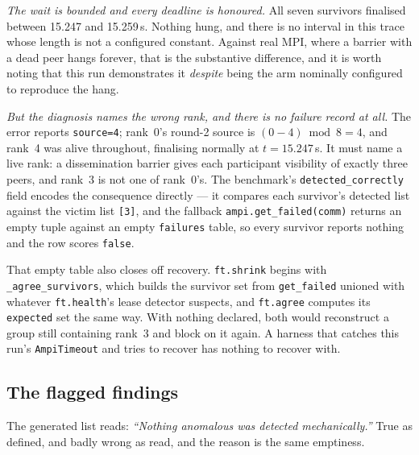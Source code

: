 \documentclass[11pt]{article}
\begin{document}
\emph{The wait is bounded and every deadline is honoured.} All seven survivors finalised
between 15.247 and 15.259\,s. Nothing hung, and there is no interval in this trace whose
length is not a configured constant. Against real MPI, where a barrier with a dead peer
hangs forever, that is the substantive difference, and it is worth noting that this run
demonstrates it \emph{despite} being the arm nominally configured to reproduce the hang.

\emph{But the diagnosis names the wrong rank, and there is no failure record at all.} The
error reports \texttt{source=4}; rank~0's round-2 source is $(0-4) \bmod 8 = 4$, and
rank~4 was alive throughout, finalising normally at $t=15.247$\,s. It must name a live
rank: a dissemination barrier gives each participant visibility of exactly three peers,
and rank~3 is not one of rank~0's. The benchmark's \texttt{detected\_correctly} field
encodes the consequence directly --- it compares each survivor's detected list against the
victim list \texttt{[3]}, and the fallback \texttt{ampi.get\_failed(comm)} returns an empty
tuple against an empty \texttt{failures} table, so every survivor reports nothing and the
row scores \texttt{false}.

That empty table also closes off recovery. \texttt{ft.shrink} begins with
\texttt{\_agree\_survivors}, which builds the survivor set from \texttt{get\_failed}
unioned with whatever \texttt{ft.health}'s lease detector suspects, and \texttt{ft.agree}
computes its \texttt{expected} set the same way. With nothing declared, both would
reconstruct a group still containing rank~3 and block on it again. A harness that catches
this run's \texttt{AmpiTimeout} and tries to recover has nothing to recover with.

\subsection{The flagged findings}

The generated list reads: \emph{``Nothing anomalous was detected mechanically.''} True as
defined, and badly wrong as read, and the reason is the same emptiness.
\end{document}
